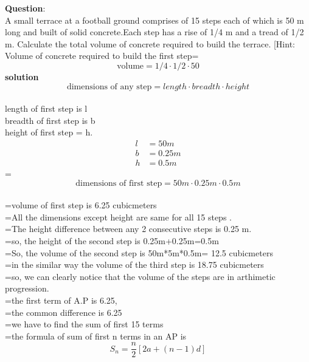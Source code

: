 \documentclass[journal,12pt,twocolumn]{IEEEtran}
\theoremstyle{remark}
\begin{document}

\vspace{3cm}

\title{}
\author{EE23BTECH11033-killana jaswanth}
\maketitle
\newpage

\bigskip

\renewcommand{\thefigure}{\theenumi}
\renewcommand{\thetable}{\theenumi}
\textbf{Question}:\\

A small terrace at a football ground comprises of 15 steps each of which is 50
m long and built of solid concrete.Each step has a rise of 1/4 m and a tread of
1/2 m. Calculate the total volume of concrete required to build the terrace.
[Hint: Volume of concrete required to build the first step=\[
\text{{volume}}=1/4 \cdot 1/2 \cdot 50
\]
\textbf{solution} \[
\text{{dimensions of any step}}= length \cdot breadth \cdot height
\]
\\length of first step is l 
\\breadth of first step is b
\\height of first step = h.
\begin{align}
    l&=50m\\
    b&=0.25m\\
    h&=0.5m
    \end{align}=
\[
\text{{dimensions of first step}} = 50m \cdot 0.25m \cdot 0.5m 
\]
\\=volume of first step is 6.25 cubicmeters
\\=All the dimensions except height are same for all 15 steps .
\\=The height difference between any 2 consecutive steps is 0.25 m.
\\=so, the height of the second step is 0.25m+0.25m=0.5m
\\=So, the volume of the second step is 50m*5m*0.5m= 12.5 cubicmeters
\\=in the similar way the volume of the third step is 18.75 cubicmeters
\\=so, we can clearly notice that the volume of the steps are in arthimetic progression.
\\=the first term of A.P is 6.25,
\\=the common difference is 6.25
\\=we have to find the sum of first 15 terms
\\=the formula of sum of first n terms in an AP is \[
S_n = \frac{n}{2} [2a+(n-1)d]
\]
\end{document}
